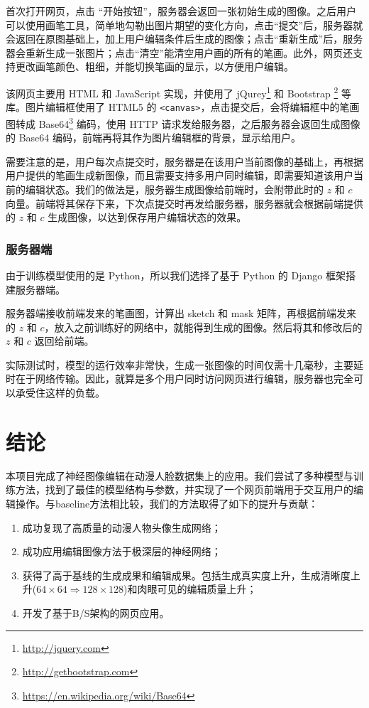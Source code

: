 \documentclass[a4paper,12pt,UTF8]{ctexart}
\begin{document}
首次打开网页，点击 “开始按钮”，服务器会返回一张初始生成的图像。之后用户可以使用画笔工具，简单地勾勒出图片期望的变化方向，点击“提交”后，服务器就会返回在原图基础上，加上用户编辑条件后生成的图像；点击“重新生成”后，服务器会重新生成一张图片；点击“清空”能清空用户画的所有的笔画。此外，网页还支持更改画笔颜色、粗细，并能切换笔画的显示，以方便用户编辑。

该网页主要用 HTML 和 JavaScript 实现，并使用了 jQurey\footnote{\url{http://jquery.com}} 和 Bootstrap \footnote{\url{http://getbootstrap.com}} 等库。图片编辑框使用了 HTML5 的 \texttt{<canvas>}，点击提交后，会将编辑框中的笔画图转成 Base64\footnote{\url{https://en.wikipedia.org/wiki/Base64}} 编码，使用 HTTP 请求发给服务器，之后服务器会返回生成图像的 Base64 编码，前端再将其作为图片编辑框的背景，显示给用户。

需要注意的是，用户每次点提交时，服务器是在该用户当前图像的基础上，再根据用户提供的笔画生成新图像，而且需要支持多用户同时编辑，即需要知道该用户当前的编辑状态。我们的做法是，服务器生成图像给前端时，会附带此时的 $z$ 和 $c$ 向量。前端将其保存下来，下次点提交时再发给服务器，服务器就会根据前端提供的 $z$ 和 $c$ 生成图像，以达到保存用户编辑状态的效果。

\subsubsection{服务器端}
由于训练模型使用的是 Python，所以我们选择了基于 Python 的 Django 框架搭建服务器端。

服务器端接收前端发来的笔画图，计算出 sketch 和 mask 矩阵，再根据前端发来的 $z$ 和 $c$，放入之前训练好的网络中，就能得到生成的图像。然后将其和修改后的 $z$ 和 $c$ 返回给前端。

实际测试时，模型的运行效率非常快，生成一张图像的时间仅需十几毫秒，主要延时在于网络传输。因此，就算是多个用户同时访问网页进行编辑，服务器也完全可以承受住这样的负载。

\section{结论}

本项目完成了神经图像编辑在动漫人脸数据集上的应用。我们尝试了多种模型与训练方法，找到了最佳的模型结构与参数，并实现了一个网页前端用于交互用户的编辑操作。与baseline方法相比较，我们的方法取得了如下的提升与贡献：

\begin{enumerate}
  \item 成功复现了高质量的动漫人物头像生成网络；
  \item 成功应用编辑图像方法于极深层的神经网络；
  \item 获得了高于基线的生成成果和编辑成果。包括生成真实度上升，生成清晰度上升($64 \times 64 \Rightarrow 128 \times 128$)和肉眼可见的编辑质量上升；
  \item 开发了基于B/S架构的网页应用。
\end{enumerate}
\end{document}
